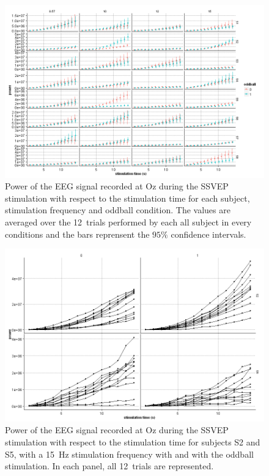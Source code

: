 %
\begin{figure}[t]
\centering
\includegraphics[width=\textwidth]{pix/meanPsdPlots}
\caption{
Power of the EEG signal recorded at Oz during the SSVEP stimulation with respect to the stimulation time for each subject, stimulation frequency and oddball condition.
The values are averaged over the 12~trials performed by each all subject in every conditions and the bars reprensent the $95\%$ confidence intervals.
}
\label{fig:meanPsd}
\end{figure}

%
\begin{figure}[t]
\centering
\includegraphics[width=\textwidth]{pix/psdPlotsAllTrials}
\caption{Power of the EEG signal recorded at Oz during the SSVEP stimulation with respect to the stimulation time for subjects S2 and S5, with a \SI{15}{\Hz} stimulation frequency with and with the oddball stimulation.
In each panel, all 12~trials are represented.
}
\label{fig:PsdAllTrials}
\end{figure}

